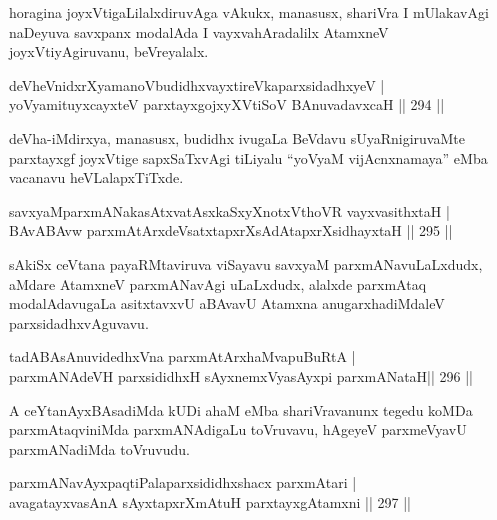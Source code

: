 \begin{artha}
horagina joyxVtigaLilalxdiruvAga vAkukx, manasusx, shariVra I mUlakavAgi naDeyuva savxpanx modalAda I vayxvahAradalilx AtamxneV joyxVtiyAgiruvanu, beVreyalalx.
\end{artha}

\begin{shl}
deVheVnidxrXyamanoVbudidhxvayxtireVkaparxsidadhxyeV | \\
yoV\s yamituyxcayxteV parxtayxgojxyXVtiSoV BAnuvadavxcaH \hfill ||  294 ||  
\end{shl}

\begin{artha}
deVha-iMdirxya, manasusx, budidhx ivugaLa BeVdavu sUyaRnigiruvaMte parxtayxgf joyxVtige sapxSaTxvAgi tiLiyalu ``yoV\s yaM vijAcnxnamaya'' eMba vacanavu heVLalapxTiTxde.
\end{artha}

\begin{shl}
savxyaMparxmANakasAtxvatAsxkaSxyXnotxV\s thoVR vayxvasithxtaH | \\
BAvABAvw parxmAtArxdeVsatxtapxrXsAdAtapxrXsidhayxtaH \hfill ||  295 ||  
\end{shl}

\begin{artha}
sAkiSx ceVtana payaRMtaviruva viSayavu savxyaM parxmANavuLaLxdudx, aMdare AtamxneV parxmANavAgi uLaLxdudx, alalxde parxmAtaq modalAdavugaLa asitxtavxvU aBAvavU Atamxna anugarxhadiMdaleV parxsidadhxvAguvavu.
\end{artha}


\begin{shl}
tadABAsAnuvidedhxVna parxmAtArx\s haMvapuBuRtA | \\
parxmANAdeVH parxsididhxH sAyxnemxVyasAyxpi parxmANataH\hfill  ||  296 ||  
\end{shl}

\begin{artha}
A ceYtanAyxBAsadiMda kUDi ahaM eMba shariVravanunx tegedu koMDa parxmAtaqviniMda parxmANAdigaLu toVruvavu, hAgeyeV parxmeVyavU parxmANadiMda toVruvudu.
\end{artha}


\begin{shl}
parxmANavAyxpaqtiPalaparxsididhxshacx parxmAtari | \\
avagatayxvasAnA sAyxtapxrXmAtuH parxtayxgAtamxni \hfill ||  297 ||  
\end{shl}

